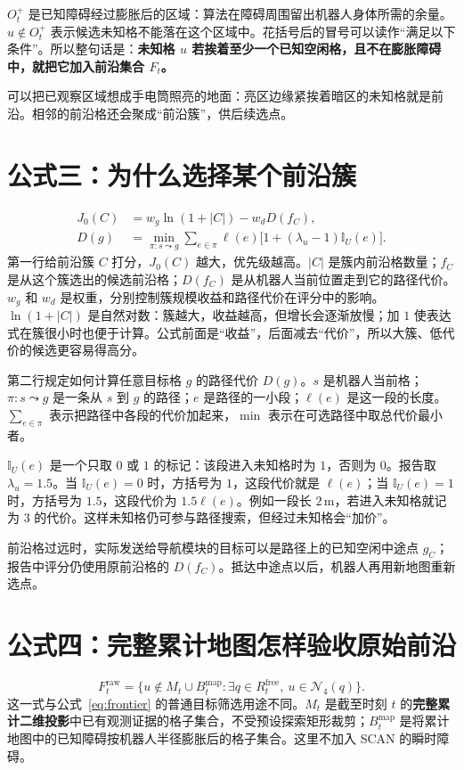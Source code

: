 \documentclass[UTF8,12pt,a4paper]{ctexart}
\begin{document}
$O_t^{+}$ 是已知障碍经过膨胀后的区域：算法在障碍周围留出机器人身体所需的余量。$u\notin O_t^{+}$ 表示候选未知格不能落在这个区域中。花括号后的冒号可以读作“满足以下条件”。所以整句话是：\textbf{未知格 $u$ 若挨着至少一个已知空闲格，且不在膨胀障碍中，就把它加入前沿集合 $F_t$。}

可以把已观察区域想成手电筒照亮的地面：亮区边缘紧挨着暗区的未知格就是前沿。相邻的前沿格还会聚成“前沿簇”，供后续选点。

\section{公式三：为什么选择某个前沿簇}
\begin{equation}\label{eq:score}
\begin{aligned}
J_0(C)&=w_g\ln(1+|C|)-w_dD(f_C),\\
D(g)&=\min_{\pi:s\leadsto g}
\sum_{e\in\pi}\ell(e)
\bigl[1+(\lambda_u-1)\mathbb I_U(e)\bigr].
\end{aligned}
\end{equation}
第一行给前沿簇 $C$ 打分，$J_0(C)$ 越大，优先级越高。$|C|$ 是簇内前沿格数量；$f_C$ 是从这个簇选出的候选前沿格；$D(f_C)$ 是从机器人当前位置走到它的路径代价。$w_g$ 和 $w_d$ 是权重，分别控制簇规模收益和路径代价在评分中的影响。$\ln(1+|C|)$ 是自然对数：簇越大，收益越高，但增长会逐渐放慢；加 $1$ 使表达式在簇很小时也便于计算。公式前面是“收益”，后面减去“代价”，所以大簇、低代价的候选更容易得高分。

第二行规定如何计算任意目标格 $g$ 的路径代价 $D(g)$。$s$ 是机器人当前格；$\pi:s\leadsto g$ 是一条从 $s$ 到 $g$ 的路径；$e$ 是路径的一小段；$\ell(e)$ 是这一段的长度。$\sum_{e\in\pi}$ 表示把路径中各段的代价加起来，$\min$ 表示在可选路径中取总代价最小者。

$\mathbb I_U(e)$ 是一个只取 $0$ 或 $1$ 的标记：该段进入未知格时为 $1$，否则为 $0$。报告取 $\lambda_u=1.5$。当 $\mathbb I_U(e)=0$ 时，方括号为 $1$，这段代价就是 $\ell(e)$；当 $\mathbb I_U(e)=1$ 时，方括号为 $1.5$，这段代价为 $1.5\ell(e)$。例如一段长 $2\,\mathrm m$，若进入未知格就记为 $3$ 的代价。这样未知格仍可参与路径搜索，但经过未知格会“加价”。

前沿格过远时，实际发送给导航模块的目标可以是路径上的已知空闲中途点 $g_C$；报告中评分仍使用原前沿格的 $D(f_C)$。抵达中途点以后，机器人再用新地图重新选点。

\section{公式四：完整累计地图怎样验收原始前沿}
\begin{equation}\label{eq:raw_global_frontier}
F_t^{\mathrm{raw}}=\{u\notin M_t\cup B_t^{\mathrm{map}}:
\exists q\in R_t^{\mathrm{free}},\ u\in\mathcal N_4(q)\}.
\end{equation}
这一式与公式~\eqref{eq:frontier} 的普通目标筛选用途不同。$M_t$ 是截至时刻 $t$ 的\textbf{完整累计二维投影}中已有观测证据的格子集合，不受预设探索矩形裁剪；$B_t^{\mathrm{map}}$ 是将累计地图中的已知障碍按机器人半径膨胀后的格子集合。这里不加入 SCAN 的瞬时障碍。
\end{document}

